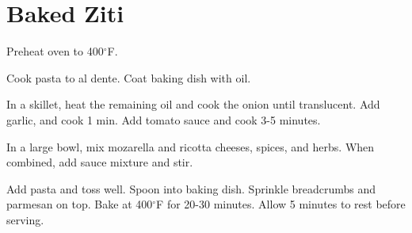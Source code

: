 \section{Baked Ziti}
\begin{recipe}



	Preheat oven to 400$^{\circ}$F.

	Cook pasta to al dente. Coat baking dish with oil.

	In a skillet, heat the remaining oil and cook the onion until translucent. Add garlic, and cook 1 min. Add tomato sauce and cook 3-5 minutes.

	In a large bowl, mix mozarella and ricotta cheeses, spices, and herbs. When combined, add sauce mixture and stir.

	Add pasta and toss well. Spoon into baking dish. Sprinkle breadcrumbs and parmesan on top. Bake at 400$^{\circ}$F for 20-30 minutes. Allow 5 minutes to rest before serving.

\end{recipe}
